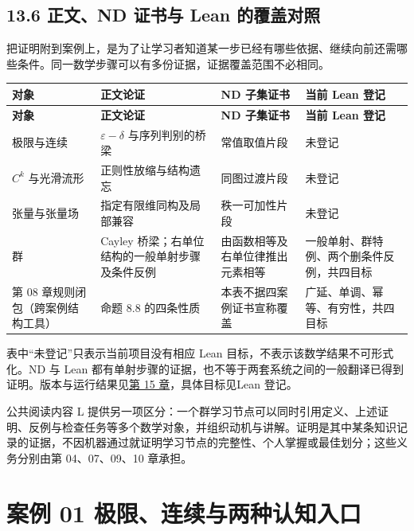 \documentclass[UTF8,a4paper,zihao=-4,fontset=windows,openany]{ctexbook}
\newcommand{\mcsorigin}[1]{\par\noindent{\small\color{black!55}#1}\par\addvspace{0.8em}}
\begin{document}
\section{13.6 正文、ND 证书与 Lean 的覆盖对照}
把证明附到案例上，是为了让学习者知道某一步已经有哪些依据、继续向前还需哪些条件。同一数学步骤可以有多份证据，证据覆盖范围不必相同。

\begingroup\small\setlength{\tabcolsep}{4pt}
\begin{longtable}{>{\raggedright\arraybackslash}p{}>{\raggedright\arraybackslash}p{}>{\raggedright\arraybackslash}p{}>{\raggedright\arraybackslash}p{}}
\toprule
\textbf{对象} & \textbf{正文论证} & \textbf{ND 子集证书} & \textbf{当前 Lean 登记} \\
\midrule
\endfirsthead
\toprule
\textbf{对象} & \textbf{正文论证} & \textbf{ND 子集证书} & \textbf{当前 Lean 登记} \\
\midrule
\endhead
\bottomrule
\endfoot
\bottomrule
\endlastfoot
极限与连续 & \(\varepsilon-\delta\) 与序列判别的桥梁 & 常值取值片段 & 未登记 \\
\(C^{k}\) 与光滑流形 & 正则性放缩与结构遗忘 & 同图过渡片段 & 未登记 \\
张量与张量场 & 指定有限维同构及局部兼容 & 秩一可加性片段 & 未登记 \\
群 & Cayley 桥梁；右单位结构的一般单射步骤及条件反例 & 由函数相等及右单位律推出元素相等 & 一般单射、群特例、两个删条件反例，共四目标 \\
第 08 章规则闭包（跨案例结构工具） & 命题 8.8 的四条性质 & 本表不据四案例证书宣称覆盖 & 广延、单调、幂等、有穷性，共四目标 \\
\end{longtable}
\endgroup

表中“未登记”只表示当前项目没有相应 Lean 目标，不表示该数学结果不可形式化。ND 与 Lean 都有单射步骤的证据，也不等于两套系统之间的一般翻译已得到证明。版本与运行结果见\hyperref[mcs-source-21]{第 15 章}，具体目标见Lean 登记。

公共阅读内容 L 提供另一项区分：一个群学习节点可以同时引用定义、上述证明、反例与检查任务等多个数学对象，并组织动机与讲解。证明是其中某条知识记录的证据，不因机器通过就证明学习节点的完整性、个人掌握或最佳划分；这些义务分别由第 04、07、09、10 章承担。

\clearpage\chapter{案例 01 极限、连续与两种认知入口}
\label{mcs-source-16}
\mcsorigin{原章节：01-极限与连续.md}
\end{document}
